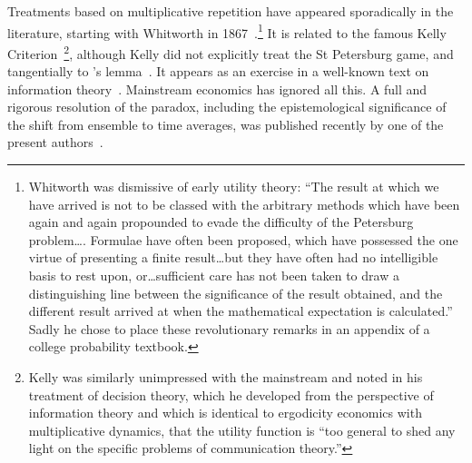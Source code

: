 Treatments based on multiplicative repetition have appeared sporadically in the 
literature, starting with Whitworth in 
1867~\cite[App.~IV]{Whitworth1867}.\footnote{Whitworth was dismissive of early 
utility theory: ``The result at which we have arrived is not to be classed with 
the arbitrary methods which have been again and again propounded to evade 
the difficulty of the Petersburg problem\ldots. Formulae have often been proposed, 
which have possessed the one virtue of presenting a finite result\ldots but they 
have often had no intelligible basis to rest upon, or\ldots sufficient care has not 
been taken to draw a distinguishing line between the significance of the result 
obtained, and the different result arrived at when the mathematical expectation 
is calculated.'' Sadly he chose to place these revolutionary remarks in an appendix 
of a college probability textbook.} It is related to the famous Kelly 
Criterion~\cite{Kelly1956}\footnote{Kelly was similarly unimpressed with the 
mainstream and noted in his treatment of decision theory, which he developed 
from the perspective of information theory and which is identical to ergodicity 
economics with multiplicative dynamics, that the utility function is ``too general 
to shed any light on the specific problems of communication theory.''}, although 
Kelly did not explicitly treat the St Petersburg game, and tangentially to \Ito's 
lemma~\cite{Ito1944}. It appears as an exercise in a well-known text on information 
theory~\cite[Ex.~6.17]{CoverThomas1991}. Mainstream economics has ignored all 
this. A full and rigorous resolution of the paradox, including the epistemological 
significance of the shift from ensemble to time averages, was published recently 
by one of the present authors~\cite{Peters2011b}.

